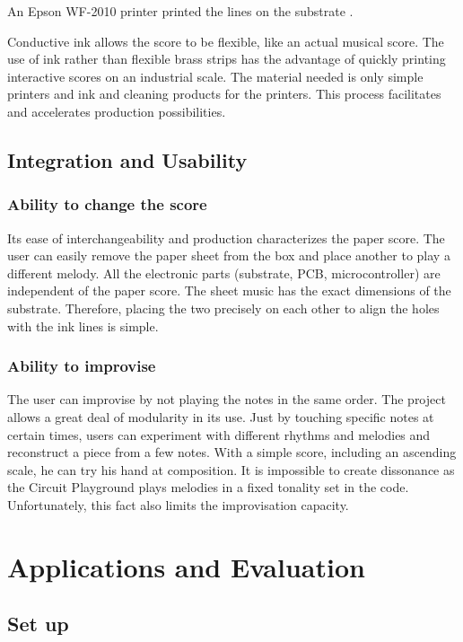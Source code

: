 An Epson WF-2010 printer printed the lines on the substrate \cite{adrien2022capacitive_to_notes}.

Conductive ink allows the score to be flexible, like an actual musical score. The use of ink rather than flexible brass strips has the advantage of quickly printing interactive scores on an industrial scale. The material needed is only simple printers and ink and cleaning products for the printers. This process facilitates and accelerates production possibilities.

\subsection{Integration and Usability}

\subsubsection{Ability to change the score}

Its ease of interchangeability and production characterizes the paper score. The user can easily remove the paper sheet from the box and place another to play a different melody. All the electronic parts (substrate, PCB, microcontroller) are independent of the paper score. The sheet music has the exact dimensions of the substrate.
Therefore, placing the two precisely on each other to align the holes with the ink lines is simple.

\subsubsection{Ability to improvise}

The user can improvise by not playing the notes in the same order.
The project allows a great deal of modularity in its use. Just by touching specific notes at certain times, users can experiment with different rhythms and melodies and reconstruct a piece from a few notes.
With a simple score, including an ascending scale, he can try his hand at composition.
It is impossible to create dissonance as the Circuit Playground plays melodies in a fixed tonality set in the code. Unfortunately, this fact also limits the improvisation capacity.


\section{Applications and Evaluation}

\subsection{Set up}

